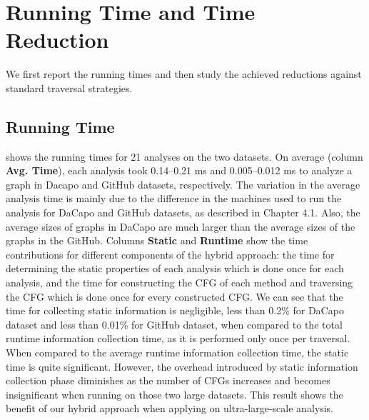 
\chapter{Running Time and Time Reduction}
\label{sec:performance-gain}

We first report the running times and then study the achieved reductions against standard traversal strategies. 

\section{Running Time}

 shows the running times for 21 analyses on the two 
datasets. On average (column \textbf{Avg. Time}), each analysis took 
0.14--0.21 ms and 0.005--0.012 ms to analyze a graph in Dacapo and GitHub 
datasets, respectively. The variation in the average analysis time is 
mainly due to the difference in the machines used to run the analysis for 
DaCapo and GitHub datasets, as described in Chapter 4.1. Also, the average 
sizes of graphs in DaCapo are much larger than the average sizes of the graphs in the GitHub.
%
Columns \textbf{Static} and \textbf{Runtime} show the time contributions for 
different components of the hybrid approach: the time for determining the 
static properties of each analysis which is done once for each analysis, and 
the time for constructing the CFG of each method and traversing the CFG which 
is done once for every constructed CFG. 
We can see that the time for collecting static information is negligible, 
less than 0.2\% for DaCapo dataset and less than 0.01\% for GitHub 
dataset, when compared to the total runtime information collection time, as it is performed only 
once per traversal. When compared to the average runtime information collection time, the static 
time is quite significant. However, the overhead introduced by static 
information collection phase diminishes as the number of CFGs increases and 
becomes insignificant when running on those two large datasets. This result 
shows the benefit of our hybrid approach when applying on ultra-large-scale
analysis.

